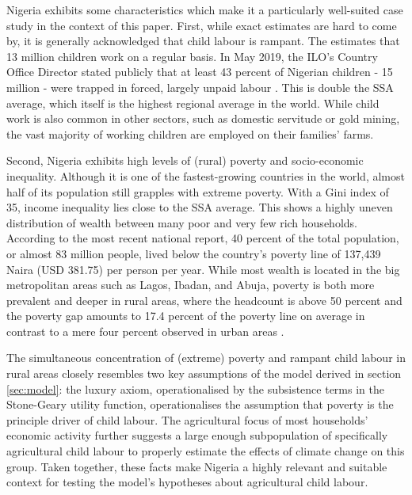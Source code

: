 \documentclass[a4paper,12pt]{article}
\theoremstyle{plain}
\theoremstyle{definition}
\theoremstyle{definition}
\theoremstyle{definition}
\theoremstyle{definition}
\begin{document}
Nigeria exhibits some characteristics which make it a particularly well-suited case study in the context of this paper. First, while exact estimates are hard to come by, it is generally acknowledged that child labour is rampant. The \citet{USDepartmentofLabor2021} estimates that 13 million children work on a regular basis. In May 2019, the ILO's Country Office Director stated publicly that at least 43 percent of Nigerian children - 15 million - were trapped in forced, largely unpaid labour \citep{ILO2019}. This is double the SSA average, which itself is the highest regional average in the world. While child work is also common in other sectors, such as domestic servitude or gold mining, the vast majority of working children are employed on their families' farms.

Second, Nigeria exhibits high levels of (rural) poverty and socio-economic inequality. Although it is one of the fastest-growing countries in the world, almost half of its population still grapples with extreme poverty. With a Gini index of 35, income inequality lies close to the SSA average. This shows a highly uneven distribution of wealth between many poor and very few rich households. According to the most recent national report, 40 percent of the total population, or almost 83 million people, lived below the country's poverty line of 137,439 Naira (USD 381.75) per person per year. While most wealth is located in the big metropolitan areas such as Lagos, Ibadan, and Abuja, poverty is both more prevalent and deeper in rural areas, where the headcount is above 50 percent and the poverty gap amounts to 17.4 percent of the poverty line on average in contrast to a mere four percent observed in urban areas \citep{NBS2020}.

The simultaneous concentration of (extreme) poverty and rampant child labour in rural areas closely resembles two key assumptions of the model derived in section \ref{sec:model}: the luxury axiom, operationalised by the subsistence terms in the Stone-Geary utility function, operationalises the assumption that poverty is the principle driver of child labour. The agricultural focus of most households' economic activity further suggests a large enough subpopulation of specifically agricultural child labour to properly estimate the effects of climate change on this group. Taken together, these facts make Nigeria a highly relevant and suitable context for testing the model's hypotheses about agricultural child labour.
\end{document}
